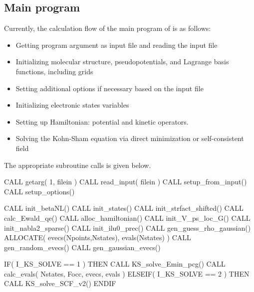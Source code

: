 \subsection{Main program}

Currently, the calculation flow of the main program of \ffrLFDFT is as follows:
\begin{itemize}
\item Getting program argument as input file and reading the input file
\item Initializing molecular structure, pseudopotentials, and 
Lagrange basis functions, including grids
\item Setting additional options if necessary based on the input file
\item Initializing electronic states variables
\item Setting up Hamiltonian: potential and kinetic operators.
\item Solving the Kohn-Sham equation via direct minimization
or self-consistent field
\end{itemize}

The appropriate subroutine calls is given below.

\begin{fortrancode}
CALL getarg( 1, filein )
CALL read_input( filein )
CALL setup_from_input()
CALL setup_options()

CALL init_betaNL()
CALL init_states()
CALL init_strfact_shifted()
CALL calc_Ewald_qe()
CALL alloc_hamiltonian()
CALL init_V_ps_loc_G()
CALL init_nabla2_sparse()
CALL init_ilu0_prec()
CALL gen_guess_rho_gaussian()
ALLOCATE( evecs(Npoints,Nstates), evals(Nstates) )
CALL gen_random_evecs()
CALL gen_gaussian_evecs()

IF( I_KS_SOLVE == 1 ) THEN 
  CALL KS_solve_Emin_pcg()
  CALL calc_evals( Nstates, Focc, evecs, evals )
ELSEIF( I_KS_SOLVE == 2 ) THEN 
  CALL KS_solve_SCF_v2()
ENDIF 
\end{fortrancode}


